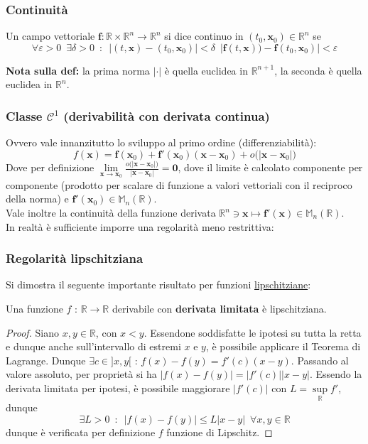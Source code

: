 \documentclass[10pt, oneside]{book}
\theoremstyle{plain}
\begin{document}
\subsubsection{Continuità} 
\begin{defin}
Un campo vettoriale $\displaystyle \mathbf{f} : \mathbb{R} \times \mathbb{R}^n \rightarrow \mathbb{R}^n$ si dice continuo in $(t_0, \mathbf{x}_0) \in \mathbb{R}^n$ se 
\[\forall \varepsilon > 0 \enspace \exists \delta > 0 \enspace : \enspace |(t,\mathbf{x}) - (t_0, \mathbf{x}_0)| < \delta \enspace |\mathbf{f}(t,\mathbf{x})) - \mathbf{f}(t_0, \mathbf{x}_0)| < \varepsilon\]
\end{defin}
\textbf{Nota sulla def:} la prima norma $|\cdot|$ è quella euclidea in $\mathbb{R}^{n+1}$, la seconda è quella euclidea in $\mathbb{R}^n$.

\subsubsection{Classe $\mathcal{C}^1$ (derivabilità con derivata continua)} Ovvero vale innanzitutto lo sviluppo al primo ordine (differenziabilità):
\[f(\mathbf{x}) = \mathbf{f}(\mathbf{x}_0) + \mathbf{f}'(\mathbf{x}_0) (\mathbf{x} - \mathbf{x}_0) + o\big(|\mathbf{x} - \mathbf{x}_0|\big)\]
Dove per definizione $\displaystyle \lim\limits_{\mathbf{x} \rightarrow \mathbf{x}_0} \frac{o\big(|\mathbf{x} - \mathbf{x}_0|\big)}{|\mathbf{x} - \mathbf{x}_0|} = \mathbf{0}$, dove il limite è calcolato componente per componente (prodotto per scalare di funzione a valori vettoriali con il reciproco della norma) e $\displaystyle \mathbf{f}'(\mathbf{x}_0) \in \mathbb{M}_n(\mathbb{R})$.
\\Vale inoltre la continuità della funzione derivata $\displaystyle \mathbb{R}^n \owns \mathbf{x} \mapsto \mathbf{f}'(\mathbf{x}) \in \mathbb{M}_n(\mathbb{R})$.
\\In realtà è sufficiente imporre una regolarità meno restrittiva:
\subsubsection{Regolarità lipschitziana}
Si dimostra il seguente importante risultato per funzioni \hyperlink{lipsc}{lipschitziane}:
\begin{prop}
Una funzione $f$ : $\mathbb{R} \rightarrow \mathbb{R}$ derivabile con \textbf{derivata limitata} è lipschitziana.
\end{prop}
\begin{proof}
Siano $x,y \in \mathbb{R}$, con $x<y$. Essendone soddisfatte le ipotesi su tutta la retta e dunque anche sull'intervallo di estremi $x$ e $y$, è possibile applicare il Teorema di Lagrange. Dunque $\exists c \in ]x,y[$ : $f(x) - f(y) = f'(c) (x - y)$. Passando al valore assoluto, per proprietà si ha $|f(x) - f(y)| = |f'(c)| |x - y|$. Essendo la derivata limitata per ipotesi, è possibile maggiorare $|f'(c)|$ con $L = \sup\limits_{\mathbb{R}} f'$, dunque 
\[\exists L > 0 \enspace : \enspace |f(x) - f(y)| \leq L |x - y| \enspace \forall x,y \in \mathbb{R}\]
dunque è verificata per definizione $f$ funzione di Lipschitz.
\end{proof}
\end{document}
